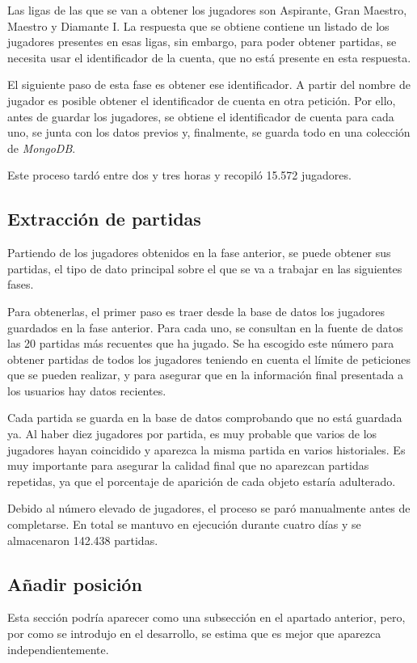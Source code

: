 Las ligas de las que se van a obtener los jugadores son Aspirante, Gran Maestro, Maestro y Diamante I. La respuesta que se obtiene contiene un listado de los jugadores presentes en esas ligas, sin embargo, para poder obtener partidas, se necesita usar el identificador de la cuenta, que no está presente en esta respuesta.

El siguiente paso de esta fase es obtener ese identificador. A partir del nombre de jugador es posible obtener el identificador de cuenta en otra petición. Por ello, antes de guardar los jugadores, se obtiene el identificador de cuenta para cada uno, se junta con los datos previos y, finalmente, se guarda todo en una colección de \textit{MongoDB}.

Este proceso tardó entre dos y tres horas y recopiló 15.572 jugadores.

\subsection{Extracción de partidas}
Partiendo de los jugadores obtenidos en la fase anterior, se puede obtener sus partidas, el tipo de dato principal sobre el que se va a trabajar en las siguientes fases.

Para obtenerlas, el primer paso es traer desde la base de datos los jugadores guardados en la fase anterior. Para cada uno, se consultan en la fuente de datos las 20 partidas más recuentes que ha jugado. Se ha escogido este número para obtener partidas de todos los jugadores teniendo en cuenta el límite de peticiones que se pueden realizar, y para asegurar que en la información final presentada a los usuarios hay datos recientes.

Cada partida se guarda en la base de datos comprobando que no está guardada ya. Al haber diez jugadores por partida, es muy probable que varios de los jugadores hayan coincidido y aparezca la misma partida en varios historiales. Es muy importante para asegurar la calidad final que no aparezcan partidas repetidas, ya que el porcentaje de aparición de cada objeto estaría adulterado.

Debido al número elevado de jugadores, el proceso se paró manualmente antes de completarse. En total se mantuvo en ejecución durante cuatro días y se almacenaron 142.438 partidas.

\subsection{Añadir posición}
Esta sección podría aparecer como una subsección en el apartado anterior, pero, por como se introdujo en el desarrollo, se estima que es mejor que aparezca independientemente.

